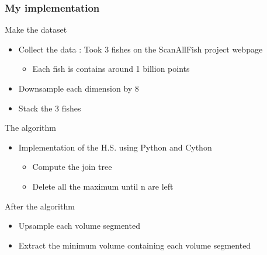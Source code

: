 \documentclass[9pt]{beamer}
\begin{document}
\begin{frame}
\frametitle{My implementation}
\begin{block}{Make the dataset}
\begin{itemize}
\item Collect the data : Took 3 fishes on the ScanAllFish project webpage
\begin{itemize}
\item Each fish is contains around 1 billion points
\end{itemize}
\item Downsample each dimension by 8
\item Stack the 3 fishes
\end{itemize}
\end{block}

\begin{block}{The algorithm}
\begin{itemize}
\item Implementation of the H.S. using Python and Cython
\begin{itemize}
\item Compute the join tree
\item Delete all the maximum until n are left
\end{itemize}
\end{itemize}
\end{block}

\begin{block}{After the algorithm}
\begin{itemize}
\item Upsample each volume segmented
\item Extract the minimum volume containing each volume segmented
\end{itemize}
\end{block}

\end{frame}
\end{document}
